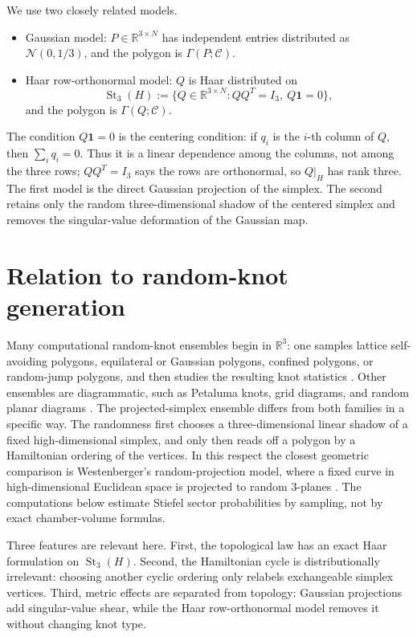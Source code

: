 \documentclass[11pt]{amsart}
\theoremstyle{remark}
\newcommand{\Rbb}{\mathbb{R}}
\newcommand{\1}{\mathbf{1}}
\newcommand{\St}{\operatorname{St}}
\begin{document}
We use two closely related models.
\begin{itemize}
\item[1.] Gaussian model: \(P\in\Rbb^{3\times N}\) has independent
entries distributed as \(\mathcal N(0,1/3)\), and the polygon is
\(\Gamma(P;\mathcal C)\).
\item[2.] Haar row-orthonormal model: \(Q\) is Haar distributed on
\[
\St_3(H):=\{Q\in\Rbb^{3\times N}:QQ^T=I_3,\ Q\1=0\},
\]
and the polygon is \(\Gamma(Q;\mathcal C)\).
\end{itemize}
The condition \(Q\1=0\) is the centering condition: if \(q_i\) is the \(i\)-th
column of \(Q\), then \(\sum_i q_i=0\).  Thus it is a linear dependence among
the columns, not among the three rows; \(QQ^T=I_3\) says the rows are
orthonormal, so \(Q|_H\) has rank three.
The first model is the direct Gaussian projection of the simplex.  The second retains only
the random three-dimensional shadow of the centered simplex and removes the singular-value
deformation of the Gaussian map.

\section{Relation to random-knot generation}

Many computational random-knot ensembles begin in \(\Rbb^3\): one samples lattice
self-avoiding polygons, equilateral or Gaussian polygons, confined polygons, or random-jump
polygons, and then studies the resulting knot statistics
\cite{SumnersWhittington,DiaoPippengerSumners,Diao,CantarellaDeguchiShonkwiler,EddyShonkwiler}.
Other ensembles are diagrammatic, such as Petaluma knots, grid diagrams, and random planar
diagrams \cite{EvenZoharModels,EvenZoharHassLinialNowikInvariants,
EvenZoharHassLinialNowikPetaluma,CantarellaChapmanMastin,ChapmanRandomDiagrams}.  The
projected-simplex ensemble differs from both families in a specific way.  The randomness
first chooses a three-dimensional linear shadow of a fixed high-dimensional simplex, and
only then reads off a polygon by a Hamiltonian ordering of the vertices.  In this respect the
closest geometric comparison is Westenberger's random-projection model, where a fixed curve
in high-dimensional Euclidean space is projected to random \(3\)-planes
\cite{WestenbergerRandomProjections}.  The computations below estimate Stiefel sector
probabilities by sampling, not by exact chamber-volume formulas.

Three features are relevant here.  First, the topological law has an exact Haar formulation
on \(\St_3(H)\).  Second, the Hamiltonian cycle is distributionally irrelevant: choosing
another cyclic ordering only relabels exchangeable simplex vertices.  Third, metric effects
are separated from topology: Gaussian projections add singular-value shear, while the
Haar row-orthonormal model removes it without changing knot type.
\end{document}
